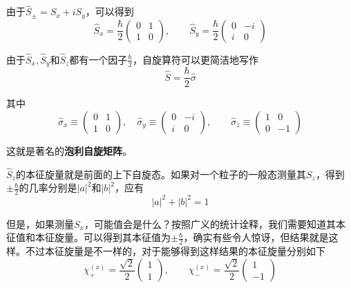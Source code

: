 \documentclass[UTF8]{ctexart}
\begin{document}
\noindent 由于$\hat{S}_{\pm} = S_x + i S_y$，可以得到 
\begin{equation}
    \hat{S}_x = \frac{\hbar}{2} \left(\begin{array}{cc}
        {0} & {1} \\
        {1} & {0}
    \end{array}\right)
    , \qquad 
    \hat{S}_y = \frac{\hbar}{2} \left(\begin{array}{cc}
        {0} & {-i} \\
        {i} & {0}
    \end{array}\right)
\end{equation}

\noindent 由于$\hat{S}_x, \hat{S}_y$和$\hat{S}_z$都有一个因子$\frac{\hbar}{2}$，自旋算符可以更简洁地写作
\begin{equation}
    \hat{S} = \frac{\hbar}{2} \hat{\sigma}
\end{equation}

\noindent 其中 
\begin{equation}
\hat{\sigma}_{x} \equiv\left(\begin{array}{ll}{0} & {1} \\ {1} & {0}\end{array}\right), \quad \hat{\sigma}_{y} \equiv\left(\begin{array}{cc}{0} & {-i} \\ {i} & {0}\end{array}\right), \quad \quad \hat{\sigma}_{z} \equiv\left(\begin{array}{cc}{1} & {0} \\ {0} & {-1}\end{array}\right)
\end{equation}

\noindent 这就是著名的\textbf{泡利自旋矩阵}。

    $\hat{S}_z$的本征旋量就是前面的上下自旋态。如果对一个粒子的一般态测量其$S_z$，得到$\pm \frac{\hbar}{2}$的几率分别是$|a|^2$和$|b|^2$，应有 
    \begin{equation}
        |a|^2 + |b|^2 =1
        \end{equation}
    
    但是，如果测量$S_x$，可能值会是什么？按照广义的统计诠释，我们需要知道其本征值和本征旋量。可以得到其本征值为$\pm \frac{\hbar}{2}$，确实有些令人惊讶，但结果就是这样。不过本征旋量是不一样的，对于能够得到这样结果的本征旋量分别如下
    \begin{equation}
        \chi_+^{(x)} = \frac{\sqrt{2}}{2} \left(\begin{array}{c}
            {1}  \\
            {1} 
        \end{array}\right)
        , \qquad 
        \chi_-^{(x)} = \frac{\sqrt{2}}{2} \left(\begin{array}{c}
            {1} \\
            {-1} 
        \end{array}\right)
    \end{equation}
\end{document}
